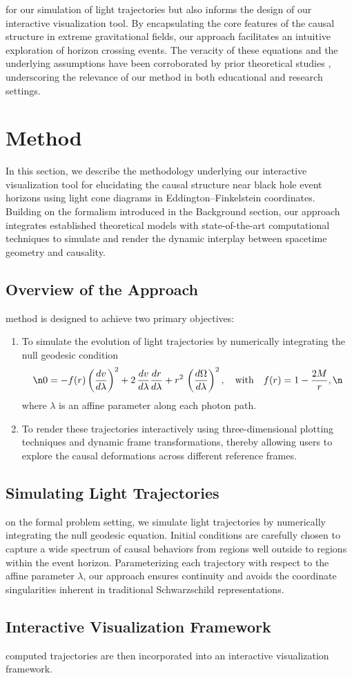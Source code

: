 \documentclass{article}
\begin{document}
for our simulation of light trajectories but also informs the design of our interactive visualization tool. By encapsulating the core features of the causal structure in extreme gravitational fields, our approach facilitates an intuitive exploration of horizon crossing events. The veracity of these equations and the underlying assumptions have been corroborated by prior theoretical studies \cite{ref2}, underscoring the relevance of our method in both educational and research settings.\section{Method}
In this section, we describe the methodology underlying our interactive visualization tool for elucidating the causal structure near black hole event horizons using light cone diagrams in Eddington--Finkelstein coordinates. Building on the formalism introduced in the Background section, our approach integrates established theoretical models with state-of-the-art computational techniques to simulate and render the dynamic interplay between spacetime geometry and causality.\n\n\subsection{Overview of the Approach}\nOur method is designed to achieve two primary objectives:\n\begin{enumerate}\n  \item To simulate the evolution of light trajectories by numerically integrating the null geodesic condition\n  \begin{equation}\n  0 = -f(r)\left(\frac{dv}{d\lambda}\right)^2 + 2\,\frac{dv}{d\lambda}\frac{dr}{d\lambda} + r^2\,\left(\frac{d\Omega}{d\lambda}\right)^2, \quad \text{with} \quad f(r)=1-\frac{2M}{r},\n  \end{equation}\n  where $\lambda$ is an affine parameter along each photon path.\n  \item To render these trajectories interactively using three-dimensional plotting techniques and dynamic frame transformations, thereby allowing users to explore the causal deformations across different reference frames.\n\end{enumerate}\n\n\subsection{Simulating Light Trajectories}\nBased on the formal problem setting, we simulate light trajectories by numerically integrating the null geodesic equation. Initial conditions are carefully chosen to capture a wide spectrum of causal behaviors from regions well outside to regions within the event horizon. Parameterizing each trajectory with respect to the affine parameter $\lambda$, our approach ensures continuity and avoids the coordinate singularities inherent in traditional Schwarzschild representations.\n\n\subsection{Interactive Visualization Framework}\nThe computed trajectories are then incorporated into an interactive visualization framework. 
\end{document}
